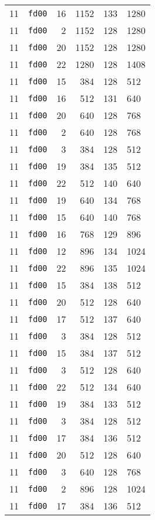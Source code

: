 \documentclass{article}
\begin{document}
\begin{table}[h!]
\begin{tabular}{llrrrl}
    11 & \texttt{fd00} & 16 & 1152 & 133 & 1280 \\
    11 & \texttt{fd00} & 2 & 1152 & 128 & 1280 \\
    11 & \texttt{fd00} & 20 & 1152 & 128 & 1280 \\
    11 & \texttt{fd00} & 22 & 1280 & 128 & 1408 \\
    11 & \texttt{fd00} & 15 & 384 & 128 & 512 \\
    11 & \texttt{fd00} & 16 & 512 & 131 & 640 \\
    11 & \texttt{fd00} & 20 & 640 & 128 & 768 \\
    11 & \texttt{fd00} & 2 & 640 & 128 & 768 \\
    11 & \texttt{fd00} & 3 & 384 & 128 & 512 \\
    11 & \texttt{fd00} & 19 & 384 & 135 & 512 \\
    11 & \texttt{fd00} & 22 & 512 & 140 & 640 \\
    11 & \texttt{fd00} & 19 & 640 & 134 & 768 \\
    11 & \texttt{fd00} & 15 & 640 & 140 & 768 \\
    11 & \texttt{fd00} & 16 & 768 & 129 & 896 \\
    11 & \texttt{fd00} & 12 & 896 & 134 & 1024 \\
    11 & \texttt{fd00} & 22 & 896 & 135 & 1024 \\
    11 & \texttt{fd00} & 15 & 384 & 138 & 512 \\
    11 & \texttt{fd00} & 20 & 512 & 128 & 640 \\
    11 & \texttt{fd00} & 17 & 512 & 137 & 640 \\
    11 & \texttt{fd00} & 3 & 384 & 128 & 512 \\
    11 & \texttt{fd00} & 15 & 384 & 137 & 512 \\
    11 & \texttt{fd00} & 3 & 512 & 128 & 640 \\
    11 & \texttt{fd00} & 22 & 512 & 134 & 640 \\
    11 & \texttt{fd00} & 19 & 384 & 133 & 512 \\
    11 & \texttt{fd00} & 3 & 384 & 128 & 512 \\
    11 & \texttt{fd00} & 17 & 384 & 136 & 512 \\
    11 & \texttt{fd00} & 20 & 512 & 128 & 640 \\
    11 & \texttt{fd00} & 3 & 640 & 128 & 768 \\
    11 & \texttt{fd00} & 2 & 896 & 128 & 1024 \\
    11 & \texttt{fd00} & 17 & 384 & 136 & 512 \\

\end{tabular}
\end{table}
\end{document}
